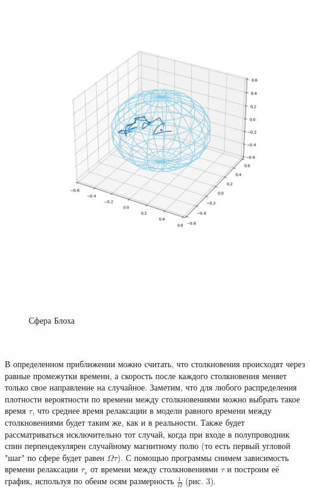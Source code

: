 \documentclass[12pt,oneside]{book}
\begin{document}
{{\begin{figure}[h!]
		\includegraphics[width = 16cm, height = 16cm]{img/Bloch_Sphere_1.png}
		\caption{Сфера Блоха}
		\label{fig:f2}
	\end{figure} 
	\\
	\\
 	В определенном приближении можно считать, что столкновения происходят через равные промежутки времени, а скорость после каждого столкновения меняет только свое направление на случайное. Заметим, что для любого распределения плотности вероятности по времени между столкновениями можно выбрать такое время $\tau$, что среднее время релаксации в модели равного времени между столкновениями будет таким же, как и в реальности. Также будет рассматриваться исключительно тот случай, когда при входе в полупроводник спин перпендекулярен случайному магнитному полю (то есть первый угловой "шаг" по сфере будет равен ${\Omega}{\tau}$).
	\newline
	\newline
	С помощью программы снимем зависимость времени релаксации $\tau_s$ от времени между столкновениями $\tau$ и построим её график, используя по обеим осям размерность $\frac{1}{\Omega}$ (рис. 3).
}}
\end{document}
